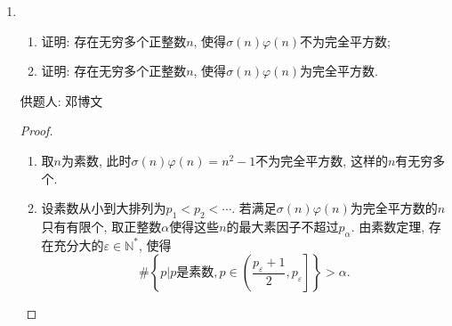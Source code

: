 \documentclass[lang=cn,12pt,a4paper]{elegantpaper.cls}
\begin{document}
\begin{enumerate}
\begin{proof}
		现在将 $\Delta_n$ 按 $M_{k_1,1}^n$ 的第一行展开,则 $M_{k_1,1}(x_1)$ 的剩余部分即为 $M_{k_1-1}^{n-1}(x_1)$ .对于 $M_{k_i}^n(x_i) (i\neq1)$ 的剩余部分,先将第一行公因式的 $(x_i-x_1)$ 提取出来,再用第二行减去第一行,然后第二行也有了公因式 $(x_i-x_1)$ ,将这一公因式提取出来后又用第三行减去第二行, 第三行也有了公因式 $(x_i-x_1)\cdots\cdots$如此反复进行下去,最终会得到 $M_{k_i}^{n-1}(x_i)$ ,并且总共提取出来了 $k_i$ 个 $(x_i-x_1)$ .于是,经过上面的变形,我们得到
		\begin{equation}
			\Delta_n(k_1,x_1;\dots;k_m,x_m)=\prod\limits_{i=2}^m(x_i-x_1)^{k_i}\Delta_{n-1}(k_1-1,x_1;\dots;k_m,x_m)
		\end{equation}
		而由归纳假设,我们有
		\begin{equation}
			\Delta_{n-1}(k_1-1,x_1;\dots;k_m,x_m)=\prod_{2\leqslant i<j\leqslant m}(x_j-x_i)^{k_ik_j}\prod_{t=2}^m(x_t-x_1)^{(k_1-1)k_t}
		\end{equation}
		将(2)代入(1)即得所求证.
	\end{proof}
	
	\item 

\begin{enumerate}[label=(\alph*)]
	\item 证明: 存在无穷多个正整数$n$, 使得$\sigma(n)\varphi(n)$不为完全平方数;
	\item 证明: 存在无穷多个正整数$n$, 使得$\sigma(n)\varphi(n)$为完全平方数.
\end{enumerate}
\begin{flushright}
	\kaishu
	供题人: 邓博文
\end{flushright}
	
		\begin{proof}
		\begin{enumerate}[label=(\alph*)]
			\item 取$n$为素数, 此时$\sigma(n)\varphi(n)=n^2-1$不为完全平方数, 这样的$n$有无穷多个.
			
			\item 设素数从小到大排列为$p_1<p_2<\cdots$.
			若满足$\sigma(n)\varphi(n)$为完全平方数的$n$只有有限个, 取正整数$\alpha$使得这些$n$的最大素因子不超过$p_\alpha$. 由素数定理, 存在充分大的$\varepsilon\in\mathbb{N}^*$, 使得\[\#\left\{p|p\text{是素数}, p\in\left(\dfrac{p_\varepsilon+1}{2},p_\varepsilon\right]\right\}>\alpha.\]
			

\end{enumerate}
\end{proof}
\end{enumerate}
\end{document}
